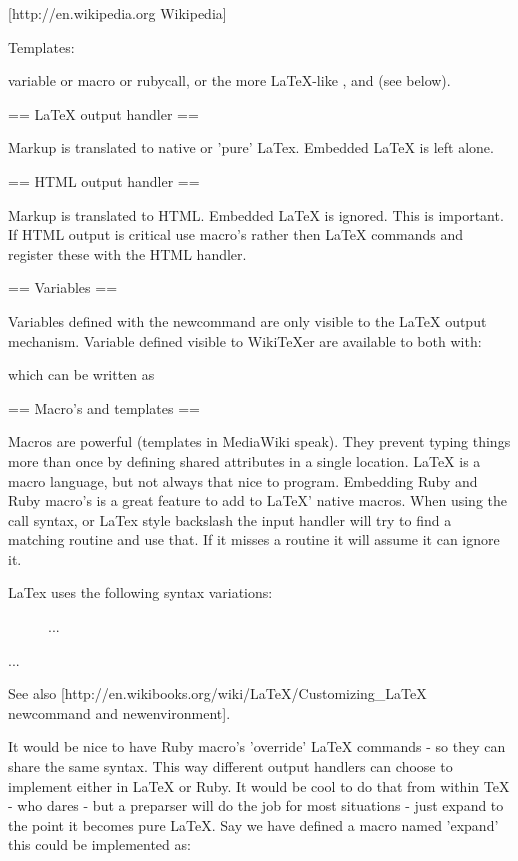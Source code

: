 [http://en.wikipedia.org Wikipedia]

Templates:

{{variable}} or {{macro}} or {{rubycall}}, or the more LaTeX-like
\variable, \macro and \rubycall (see below).


== LaTeX output handler ==

Markup is translated to native or 'pure' LaTex. Embedded LaTeX is left alone.


== HTML output handler ==

Markup is translated to HTML. Embedded LaTeX is ignored. This is
important. If HTML output is critical use macro's rather then LaTeX
commands and register these with the HTML handler.

== Variables ==

Variables defined with the newcommand are only visible to the LaTeX
output mechanism. Variable defined visible to WikiTeXer are available
to both with:


which can be written as


== Macro's and templates ==

Macros are powerful (templates in MediaWiki speak). They prevent
typing things more than once by defining shared attributes in a single
location.  LaTeX is a macro language, but not always that nice to
program.  Embedding Ruby and Ruby macro's is a great feature to add to
LaTeX' native macros. When using the {{call}} syntax, or LaTex style
backslash \call the input handler will try to find a matching routine
and use that. If it misses a routine it will assume it can ignore it.

LaTex uses the following syntax variations:

	\hfill
	\caption{This is the caption.\label{fig:rawss}}

  \begin{figure} ... \end{figure}
  \begin{minipage}[t]{0.58\linewidth} ... \end{minipage} %

See also [http://en.wikibooks.org/wiki/LaTeX/Customizing_LaTeX newcommand and newenvironment].

It would be nice to have Ruby macro's 'override' LaTeX commands - so
they can share the same syntax. This way different output handlers can
choose to implement either in LaTeX or Ruby. It would be cool to do
that from within TeX - who dares - but a preparser will do the job for
most situations - just expand to the point it becomes pure LaTeX. Say
we have defined a macro named 'expand' this could be implemented as:

